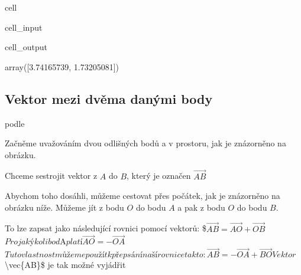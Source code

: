 \documentclass[letterpaper,10pt,english]{jupyterBook}
\begin{document}
\begin{sphinxuseclass}{cell}\begin{sphinxVerbatimInput}

\begin{sphinxuseclass}{cell_input}
\begin{sphinxVerbatim}[commandchars=\\\{\}]
 
\end{sphinxVerbatim}

\end{sphinxuseclass}\end{sphinxVerbatimInput}
\begin{sphinxVerbatimOutput}

\begin{sphinxuseclass}{cell_output}
\begin{sphinxVerbatim}[commandchars=\\\{\}]
array([3.74165739, 1.73205081])
\end{sphinxVerbatim}

\end{sphinxuseclass}\end{sphinxVerbatimOutput}

\end{sphinxuseclass}

\subsection{Vektor mezi dvěma danými body}
\label{\detokenize{Prednasky/0_2_Skal_xe1ry_a_vektory:vektor-mezi-dvema-danymi-body}}
\sphinxAtStartPar
podle 

\sphinxAtStartPar
Začněme uvažováním dvou odlišných bodů a v prostoru, jak je znázorněno na obrázku.

\sphinxAtStartPar
Chceme sestrojit vektor z \(A\) do \(B\), který je označen \(\vec{AB}\)

\sphinxAtStartPar
Abychom toho dosáhli, můžeme cestovat přes počátek, jak je znázorněno na obrázku níže. Můžeme jít z bodu \(O\) do bodu \(A\) a pak z bodu \(O\) do bodu
\(B\).

\sphinxAtStartPar
To lze zapsat jako následující rovnici pomocí vektorů:
\$\(\vec{AB} = \vec{AO} + \vec{OB} \)\(
Pro jakýkoli bod \)A\( platí
\)\(\vec{AO} = - \vec{OA}\)\(
Tuto vlastnost můžeme použít k přepsání naší rovnice takto: 
\)\(\vec{AB} = -\vec{OA} + \vec{BO} \)\(
Vektor \)\textbackslash{}vec\{AB\}\$ je tak možné vyjádřit
\end{document}
